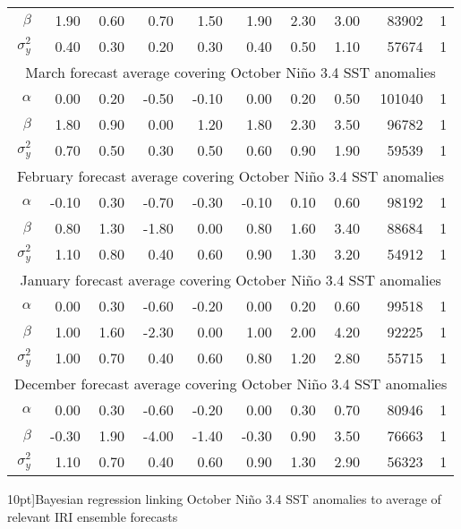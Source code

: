 \begin{table*}[ht]
\begin{tabular}{rrrrrrrrrr}
  $\beta$ & 1.90 & 0.60 & 0.70 & 1.50 & 1.90 & 2.30 & 3.00 & 83902 &   1 \\ 
  $\sigma^{2}_{y}$ & 0.40 & 0.30 & 0.20 & 0.30 & 0.40 & 0.50 & 1.10 & 57674 &   1 \\ 
   \hline
\hline
\multicolumn{10}{c}{March forecast average covering October Ni\~no 3.4 SST anomalies}\\
  \hline
$\alpha$ & 0.00 & 0.20 & -0.50 & -0.10 & 0.00 & 0.20 & 0.50 & 101040 &   1 \\ 
  $\beta$ & 1.80 & 0.90 & 0.00 & 1.20 & 1.80 & 2.30 & 3.50 & 96782 &   1 \\ 
  $\sigma^{2}_{y}$ & 0.70 & 0.50 & 0.30 & 0.50 & 0.60 & 0.90 & 1.90 & 59539 &   1 \\ 
   \hline
\hline
\multicolumn{10}{c}{February forecast average covering October Ni\~no 3.4 SST anomalies}\\
  \hline
$\alpha$ & -0.10 & 0.30 & -0.70 & -0.30 & -0.10 & 0.10 & 0.60 & 98192 &   1 \\ 
  $\beta$ & 0.80 & 1.30 & -1.80 & 0.00 & 0.80 & 1.60 & 3.40 & 88684 &   1 \\ 
  $\sigma^{2}_{y}$ & 1.10 & 0.80 & 0.40 & 0.60 & 0.90 & 1.30 & 3.20 & 54912 &   1 \\ 
   \hline
\hline
\multicolumn{10}{c}{January forecast average covering October Ni\~no 3.4 SST anomalies}\\
  \hline
$\alpha$ & 0.00 & 0.30 & -0.60 & -0.20 & 0.00 & 0.20 & 0.60 & 99518 &   1 \\ 
  $\beta$ & 1.00 & 1.60 & -2.30 & 0.00 & 1.00 & 2.00 & 4.20 & 92225 &   1 \\ 
  $\sigma^{2}_{y}$ & 1.00 & 0.70 & 0.40 & 0.60 & 0.80 & 1.20 & 2.80 & 55715 &   1 \\ 
   \hline
\hline
\multicolumn{10}{c}{December forecast average covering October Ni\~no 3.4 SST anomalies}\\
  \hline
$\alpha$ & 0.00 & 0.30 & -0.60 & -0.20 & 0.00 & 0.30 & 0.70 & 80946 &   1 \\ 
  $\beta$ & -0.30 & 1.90 & -4.00 & -1.40 & -0.30 & 0.90 & 3.50 & 76663 &   1 \\ 
  $\sigma^{2}_{y}$ & 1.10 & 0.70 & 0.40 & 0.60 & 0.90 & 1.30 & 2.90 & 56323 &   1 \\ 
   \hline
\end{tabular}
\caption[Bayesian regression linking October Ni\~no 3.4 SST anomalies to average of relevant IRI ensemble forecasts][10pt]{Bayesian regression linking October Ni\~no 3.4 SST anomalies to average of relevant IRI ensemble forecasts} 
\end{table*}
